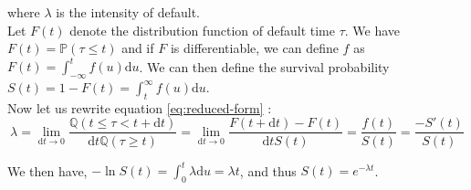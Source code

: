 \documentclass[a4paper,11pt,english]{book}
\begin{document}
where $\lambda$ is the intensity of default.\\

Let $F(t)$ denote the distribution function of default time $\tau$. We have $F(t)=\mathbb{P}(\tau\leq t)$ and if $F$ is differentiable, we can define $f$ as $F(t)=\int_{-\infty}^{t}f(u)\text{d}u$.
We can then define the survival probability $S(t) = 1-F(t) = \int_{t}^{\infty}f(u)\text{d}u$.\\

Now let us rewrite equation \ref{eq:reduced-form} :
$$\lambda = \underset{\text{d}t\to 0}{\lim} \frac{\mathbb{Q}(t\leq \tau<t+\text{d}t)}{\text{d}t\mathbb{Q}(\tau\geq t)} = \underset{\text{d}t\to 0}{\lim} \frac{F(t+\text{d}t)-F(t)}{\text{d}t S(t)}=\frac{f(t)}{S(t)}=\frac{-S'(t)}{S(t)}$$

We then have, $-\ln{S(t)}=\int_{0}^{t}\lambda \text{d}u = \lambda t$, and thus $S(t)=e^{-\lambda t}$.
\end{document}
